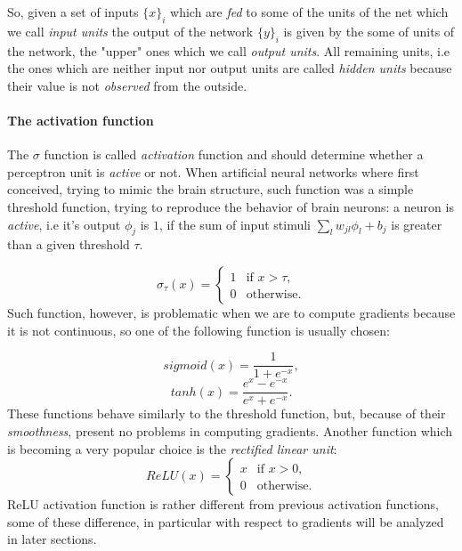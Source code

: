 So, given a set of inputs $\{x\}_i$ which are \textit{fed} to some of the units of the net which we call \textit{input units} the output of the network $\{y\}_i$ is given by the
some of units of the network, the "upper" ones which we call \textit{output units}. All remaining units, i.e the ones which are neither input nor output units
are called \textit{hidden units} because their value is not \textit{observed} from the outside.

\paragraph{The activation function}
The $\sigma$ function is called \textit{activation} function and should determine whether a perceptron unit is \textit{active} or not. When artificial neural networks where first conceived,
trying to mimic the brain structure, such function was a simple threshold function, trying to reproduce the behavior of brain neurons: a neuron is \textit{active}, i.e it's output $\phi_j$ is $1$, if
the sum of input stimuli $\sum_l w_{jl}\phi_l +b_j$ is greater than a given threshold $\tau$.

\begin{equation}
  \sigma_{\tau}(x)=\begin{cases}
    1 & \text{if $x>\tau$},\\
    0 & \text{otherwise}.
  \end{cases}
\end{equation}
Such function, however, is problematic when we are to compute gradients because it is not continuous, so one of the following function is usually chosen:

\begin{equation}
 sigmoid(x)=\frac{1}{1+e^{-x}},
\end{equation}
\begin{equation}
 tanh(x)=\frac{e^x-e^{-x}}{e^x+e^{-x}}.
\end{equation}
These functions behave similarly to the threshold function, but, because of their \textit{smoothness}, present no problems in computing gradients.
Another function which is becoming a very popular choice is the \textit{rectified linear unit}:
\begin{equation}
  ReLU(x)=\begin{cases}
    x & \text{if $x>0$},\\
    0 & \text{otherwise}.
  \end{cases}
\end{equation}
ReLU activation function is rather different from previous activation functions, some of these difference, in particular with respect to gradients will be analyzed in later sections.

